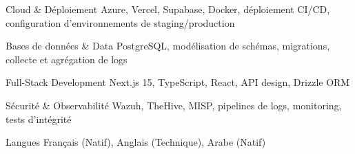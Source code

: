 
\begin{cvskills}

    \cvskill
    {Cloud \& Déploiement} %
    {Azure, Vercel, Supabase, Docker, déploiement CI/CD, configuration d'environnements de staging/production} %

    \cvskill
    {Bases de données \& Data} %
    {PostgreSQL, modélisation de schémas, migrations, collecte et agrégation de logs} %

    \cvskill
    {Full-Stack Development} %
    {Next.js 15, TypeScript, React, API design, Drizzle ORM} %

    \cvskill
    {Sécurité \& Observabilité} %
    {Wazuh, TheHive, MISP, pipelines de logs, monitoring, tests d'intégrité} %

    \cvskill
    {Langues} %
    {Français (Natif), Anglais (Technique), Arabe (Natif)} %

\end{cvskills}